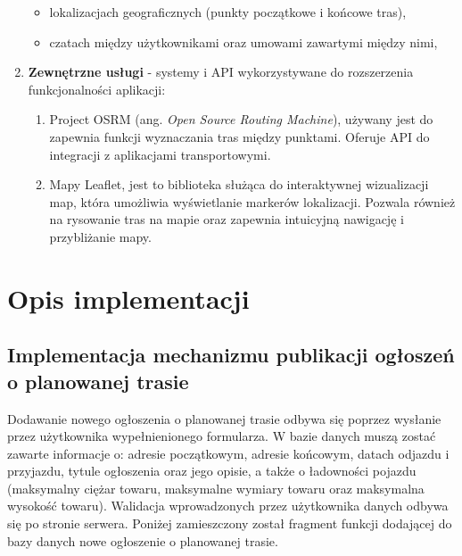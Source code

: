 \begin{enumerate}
\begin{itemize}
        \item lokalizacjach geograficznych (punkty początkowe i końcowe tras),
        \item czatach między użytkownikami oraz umowami zawartymi między nimi,
    \end{itemize}
    \item \textbf{Zewnętrzne usługi} - systemy i API wykorzystywane do rozszerzenia funkcjonalności aplikacji:
    \begin{enumerate}
        \item Project OSRM (ang. \emph{Open Source Routing Machine}), używany jest do zapewnia funkcji wyznaczania tras między punktami. Oferuje API do integracji z aplikacjami transportowymi.
        \item Mapy Leaflet, jest to biblioteka służąca do interaktywnej wizualizacji map, która umożliwia wyświetlanie markerów lokalizacji. Pozwala również na rysowanie tras na mapie oraz zapewnia intuicyjną nawigację i przybliżanie mapy.
    \end{enumerate}
\end{enumerate}

\section{Opis implementacji}
\subsection{Implementacja mechanizmu publikacji ogłoszeń o planowanej trasie}
\label{addAnnouncement}
Dodawanie nowego ogłoszenia o planowanej trasie odbywa się poprzez wysłanie przez użytkownika wypełnienionego formularza. W bazie danych muszą zostać zawarte informacje o: adresie początkowym, adresie końcowym, datach odjazdu i przyjazdu, tytule ogłoszenia oraz jego opisie, a także o ładowności pojazdu (maksymalny ciężar towaru, maksymalne wymiary towaru oraz maksymalna wysokość towaru). Walidacja wprowadzonych przez użytkownika danych odbywa się po stronie serwera. Poniżej zamieszczony został fragment funkcji dodającej do bazy danych nowe ogłoszenie o planowanej trasie.

